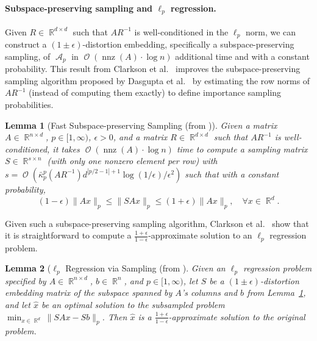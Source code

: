 \documentclass[11pt]{article}
\newtheorem{lemma}{Lemma}
\DeclareMathOperator{\bigO}{\mathcal{O}}
\DeclareMathOperator{\nnz}{nnz}
\DeclareMathOperator{\A}{\mathcal{A}}
\DeclareMathOperator{\R}{\mathbb{R}}
\begin{document}
\paragraph{Subspace-preserving sampling and $\ell_p$ regression.}
Given $R \in \R^{d \times d}$ such that $A R^{-1}$ is well-conditioned in the
$\ell_p$ norm, we can construct a $(1\pm\epsilon)$-distortion embedding,
specifically a subspace-preserving sampling, of $\A_p$ in $\bigO(\nnz(A) \cdot
\log n)$ additional time and with a constant probability.
This result from Clarkson et al.~\cite[Theorem 5.4]{CDMMMW13_SODA} improves 
the subspace-preserving sampling algorithm proposed by Dasgupta et 
al.~\cite{DDHKM09_lp_SICOMP} by estimating the row norms of $A R^{-1}$
(instead of computing them exactly) to define importance sampling 
probabilities.

\begin{lemma}[Fast Subspace-preserving Sampling (from \cite{CDMMMW13_SODA})]
  \label{lemma:fast_sampling}
  Given a matrix $A \in \R^{n \times d}$, $p \in [1, \infty)$, $\epsilon > 0$,
  and a matrix $R \in \R^{d \times d}$ such that $A R^{-1}$ is well-conditioned,
  it takes $\bigO(\nnz(A) \cdot \log n)$ time to compute a sampling matrix $S
  \in \R^{s \times n}$ (with only one nonzero element per row) with $s =
  \bigO(\bar{\kappa}_p^p(A R^{-1}) d^{|p/2-1|+1} \log(1/\epsilon) / \epsilon^2)$
  such that with a constant probability,
  \begin{equation*}
    (1-\epsilon) \|A x\|_p \leq \|S A x\|_p \leq (1+\epsilon) \|A x\|_p, \quad \forall x \in \R^d.
  \end{equation*}
\end{lemma}

\noindent
Given such a subspace-preserving sampling algorithm, Clarkson et
al.~\cite[Theorem 5.4]{CDMMMW13_SODA} show that it is straightforward to
compute a $\frac{1+\epsilon}{1-\epsilon}$-approximate solution to an $\ell_p$
regression problem.

\begin{lemma}[$\ell_p$ Regression via Sampling (from \cite{CDMMMW13_SODA}]
  \label{lemma:fast_reg}
  Given an $\ell_p$ regression problem specified by $A \in \R^{n \times d}$, $b
  \in \R^n$, and $p \in [1, \infty)$, let $S$ be a $(1\pm\epsilon)$-distortion
  embedding matrix of the subspace spanned by $A$'s columns and $b$ from
  Lemma~\ref{lemma:fast_sampling}, and let $\hat{x}$ be an optimal solution to
  the subsampled problem $\min_{x \in \R^d} \|S A x - S b\|_p$.
  Then $\hat{x}$ is a $\frac{1+\epsilon}{1-\epsilon}$-approximate solution to
  the original problem.
\end{lemma}
\end{document}
